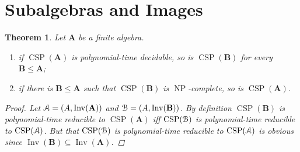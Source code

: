 \documentclass{amsart}
\theoremstyle{plain}
\newtheorem{theorem}{Theorem}[section]
\theoremstyle{definition}
\theoremstyle{remark}
\DeclareMathOperator{\CSP}{CSP}
\DeclareMathOperator{\Inv}{Inv}
\DeclareMathOperator{\NP}{NP}
\begin{document}
\section{Subalgebras and Images}
\begin{theorem}
    \label{sub}
    Let $\mathbf{A}$ be a finite algebra. 
    \begin{enumerate}
        \item if $\CSP(\mathbf{A})$ is polynomial-time decidable, so is $\CSP(\mathbf{B})$ for every $\mathbf{B} \le \mathbf{A}$; 
        \item if there is $\mathbf{B} \le \mathbf{A}$ such that $\CSP(\mathbf{B})$ is $\NP$-complete, so is $\CSP(\mathbf{A})$. 
    \end{enumerate}
    \begin{proof}
    Let $\EuScript{A}=(A, \Inv(\mathbf{A}))$ and $\EuScript{B}=(A, \Inv(\mathbf{B}))$. 
    By definition $\CSP(\mathbf{B})$ is polynomial-time reducible to $\CSP(\mathbf{A})$ iff 
    $\CSP(\EuScript{B})$ is polynomial-time reducible to $\CSP(\EuScript{A})$.
    But that $\CSP(\EuScript{B})$ is polynomial-time reducible to $\CSP(\EuScript{A})$ is obvious since $\Inv(\mathbf{B}) \subseteq \Inv(\mathbf{A})$.
    \end{proof}
\end{theorem}
\end{document}
